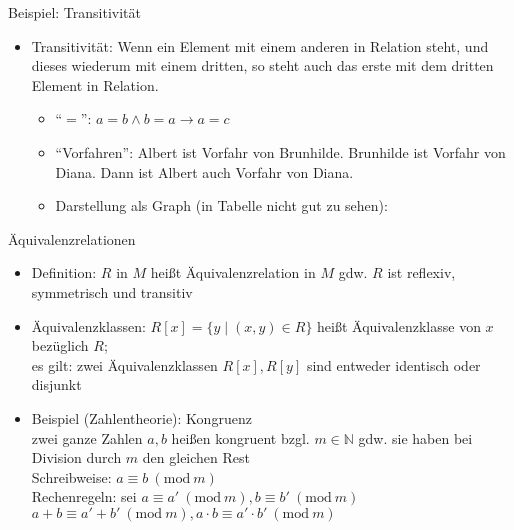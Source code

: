 \begin{frame}{Beispiel: Transitivität}
	\begin{itemize}
		\item Transitivität: Wenn ein Element mit einem anderen in Relation steht, und dieses wiederum mit einem dritten, so steht auch das erste mit dem dritten Element in Relation.
		\begin{itemize}
			\item "`$=$"': $a=b \land b=a \rightarrow a=c$
			\item "`Vorfahren"': Albert ist Vorfahr von Brunhilde. Brunhilde ist Vorfahr von Diana. Dann ist Albert auch Vorfahr von Diana.
			\item Darstellung als Graph (in Tabelle nicht gut zu sehen):\\
			\vspace{1em}
		\end{itemize}
	\end{itemize}	
\end{frame}

\begin{frame}{Äquivalenzrelationen}
	\begin{itemize}
		\item Definition: $R$ in $M$ heißt Äquivalenzrelation in $M$ gdw. $R$ ist reflexiv, symmetrisch und transitiv
		\item Äquivalenzklassen: $R[x]=\{y \mid (x,y) \in R\}$ heißt Äquivalenzklasse von $x$ bezüglich $R$;\\
			es gilt: zwei Äquivalenzklassen $R[x], R[y]$ sind entweder identisch oder disjunkt
		\item Beispiel (Zahlentheorie): Kongruenz\\
			zwei ganze Zahlen $a,b$ heißen kongruent bzgl. $m \in \mathbb{N}$ gdw. sie haben bei Division durch $m$ den gleichen Rest\\
			Schreibweise: $a \equiv b\ (\mathrm{mod}\ m)$\\
			Rechenregeln: sei $a \equiv a'\ (\mathrm{mod}\ m), b \equiv b'\ (\mathrm{mod}\ m)$\\
			$a+b\equiv a'+b'\ (\mathrm{mod}\ m), a \cdot b \equiv a' \cdot b'\ (\mathrm{mod}\ m)$
	\end{itemize}
\end{frame}

